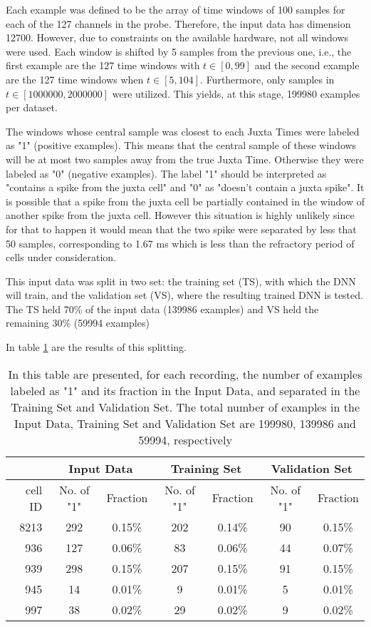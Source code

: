 Each example was defined to be the array of time windows of 100 samples for each of the 127 channels in the probe. Therefore, the input data has dimension 12700. However, due to constraints on the available hardware, not all windows were used. Each window is shifted by 5 samples from the previous one, i.e., the first example are the 127 time windows with $t \in [ 0 , 99]$ and the second example are the 127 time windows when $t \in [ 5, 104]$. Furthermore, only samples in $t \in [1000000,2000000]$ were utilized. This yields, at this stage, 199980 examples per dataset.

The windows whose central sample was closest to each Juxta Times were labeled as "1" (positive examples). This means that the central sample of these windows will be at most two samples  away from the true Juxta Time. Otherwise they were labeled as "0" (negative examples). The label "1" should be interpreted as "contains a spike from the juxta cell" and "0" as "doesn't contain a juxta spike". It is possible that a spike from the juxta cell be partially contained in the window of another spike from the juxta cell. However this situation is highly unlikely since for that to happen it would mean that the two spike were separated by less that 50 samples, corresponding to 1.67 ms which is less than the refractory period of cells under consideration.

This input data was split in two set: the training set (TS), with which the DNN will train, and the validation set (VS), where the resulting trained DNN is tested. The TS held 70\% of the input data (139986 examples) and VS held the remaining 30\% (59994 examples)

In table \ref{table:summary-beforeUS} are the results of this splitting.
\begin{table}[htbp]
\begin{center}
\begin{tabular}{r|cc|cc|cc}
\multicolumn{1}{l|}{} & \multicolumn{ 2}{c|}{Input Data} & \multicolumn{ 2}{c|}{Training Set} & \multicolumn{ 2}{c}{Validation Set} \\ \hline
cell ID & No. of "1"  & Fraction & No. of "1"  & Fraction & No. of "1" & Fraction \\ \hline
8213 & 292 & 0.15\% & 202 & 0.14\% & 90 & 0.15\% \\ 
936 & 127 & 0.06\% & 83 & 0.06\% & 44 & 0.07\% \\ 
939 & 298 & 0.15\% & 207 & 0.15\% & 91 & 0.15\% \\ 
945 & 14 & 0.01\% & 9 & 0.01\% & 5 & 0.01\% \\ 
997 & 38 & 0.02\% & 29 & 0.02\% & 9 & 0.02\% \\ 
\end{tabular}
\end{center}
\caption{In this table are presented, for each recording, the number of examples labeled as "1" and its fraction in the Input Data, and separated in the Training Set and Validation Set. The total number of examples in the Input Data, Training Set and Validation Set are 199980, 139986 and 59994, respectively}
\label{table:summary-beforeUS}
\end{table}

